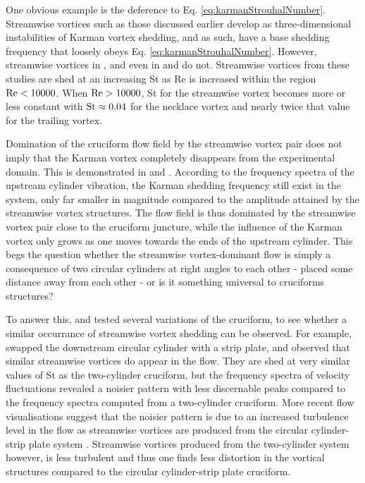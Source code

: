 \documentclass[oneside]{utmthesis}
\begin{document}
One obvious example is the deference to Eq. \ref{eq:karmanStrouhalNumber}. Streamwise vortices such as those discussed earlier \citep{Zhang2016,Rai2018,Agbaglah2019,Zhang2019} develop as three-dimensional instabilities of Karman vortex shedding, and as such, have a base shedding frequency that loosely obeys Eq. \ref{eq:karmanStrouhalNumber}. However, streamwise vortices in \citet{Takahashi1999}, and even in \citet{Shirakashi2001} and \citet{Bae2001} do not. Streamwise vortices from these studies are shed at an increasing St as Re is increased within the region $\text{Re} < 10000$. When $\text{Re} > 10000$, St for the streamwise vortex becomes more or less constant with $\text{St} \approx 0.04$ for the necklace vortex and nearly twice that value for the trailing vortex.

Domination of the cruciform flow field by the streamwise vortex pair does not imply that the Karman vortex completely disappears from the experimental domain. This is demonstrated in \citet{Koide2006} and \citet{Kato2006}. According to the frequency spectra of the upstream cylinder vibration, the Karman shedding frequency still exist in the system, only far smaller in magnitude compared to the amplitude attained by the streamwise vortex structures. The flow field is thus dominated by the streamwise vortex pair close to the cruciform juncture, while the influence of the Karman vortex only grows as one moves towards the ends of the upstream cylinder. This begs the question whether the streamwise vortex-dominant flow is simply a consequence of two circular cylinders at right angles to each other - placed some distance away from each other - or is it something universal to cruciforms structures?

To answer this, \citet{Kato2007} and \citet{Nguyen2010} tested several variations of the cruciform, to see whether a similar occurrance of streamwise vortex shedding can be observed. For example, \citet{Kato2007} swapped the downstream circular cylinder with a strip plate, and observed that similar streamwise vortices do appear in the flow. They are shed at very similar values of St as the two-cylinder cruciform, but the frequency spectra of velocity fluctuations revealed a noisier pattern with less discernable peaks compared to the frequency spectra computed from a two-cylinder cruciform. More recent flow visualisations suggest that the noisier pattern is due to an increased turbulence level in the flow as streamwise vortices are produced from the circular cylinder-strip plate system \citep{Koide2017}. Streamwise vortices produced from the two-cylinder system however, is less turbulent and thus one finds less distortion in the vortical structures compared to the circular cylinder-strip plate cruciform.
\end{document}
